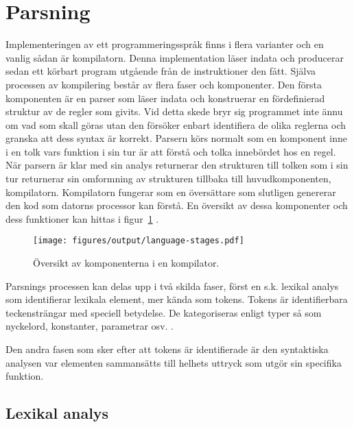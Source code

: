 \section{Parsning}

Implementeringen av ett programmeringsspråk finns i flera varianter och en
vanlig sådan är kompilatorn. Denna implementation läser indata och
producerar sedan ett körbart program utgående från de instruktioner den fått.
Själva processen av kompilering består av flera faser och komponenter. Den
första komponenten är en parser som läser indata och konstruerar en
fördefinierad struktur av de regler som givits. Vid detta skede bryr sig
programmet inte ännu om vad som skall göras utan den försöker enbart identifiera
de olika reglerna och granska att dess syntax är korrekt. Parsern körs normalt
som en komponent inne i en tolk vars funktion i sin tur är att förstå och tolka
innebördet hos en regel. När parsern är klar med sin analys returnerar den
strukturen till tolken som i sin tur returnerar sin omformning av strukturen
tillbaka till huvudkomponenten, kompilatorn. Kompilatorn fungerar som en
översättare som slutligen genererar den kod som datorns processor kan förstå.
En översikt av dessa komponenter och dess funktioner kan hittas i
figur~\ref{fig:compiler} \citep[s. 16]{pt10}.

\begin{figure}[ht]
  \texttt{[image: figures/output/language-stages.pdf]}
  \caption{Översikt av komponenterna i en kompilator.}
  \label{fig:compiler}
\end{figure}

Parsnings processen kan delas upp i två skilda faser, först en s.k.
lexikal analys som identifierar lexikala element, mer kända som tokens. Tokens
är identifierbara teckensträngar med speciell betydelse. De kategoriseras
enligt typer så som nyckelord, konstanter, parametrar osv. \citep[s. 6]{aa06}.

Den andra fasen som sker efter att tokens är identifierade är den syntaktiska
analysen var elementen sammansätts till helhets uttryck som utgör sin specifika
funktion.

\subsection{Lexikal analys}

